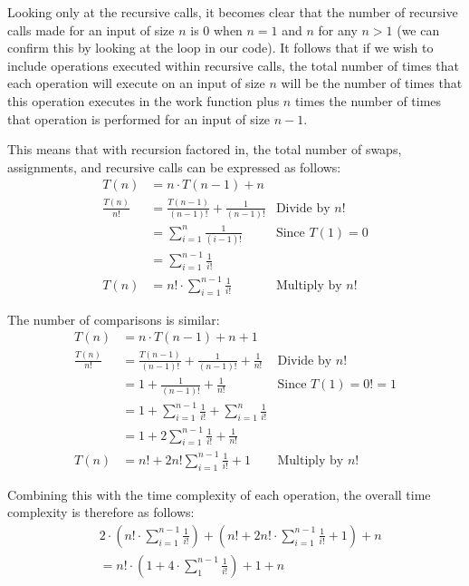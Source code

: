 \documentclass[10pt, oneside]{article}   	%
\begin{document}
Looking only at the recursive calls, it becomes clear that the number of recursive calls made for an input of size $n$ is 0 when $n = 1$ and $n$ for any $n > 1$ (we can confirm this by looking at the loop in our code). It follows that if we wish to include operations executed within recursive calls, the total number of times that each operation will execute on an input of size $n$ will be the number of times that this operation executes in the work function plus $n$ times the number of times that operation is performed for an input of size $n - 1$.

This means that with recursion factored in, the total number of swaps, assignments, and recursive calls can be expressed as follows:
\begin{align*}
	T(n) &= n \cdot T(n - 1) + n \\
	\frac{T(n)}{n!} &= \frac{T(n - 1)}{(n - 1)!} + \frac{1}{(n - 1)!} &\text{Divide by $n!$} \\
	&= \sum_{i = 1}^{n} \frac{1}{(i - 1)!} &\text{Since $T(1) = 0$} \\
	&= \sum_{i = 1}^{n - 1} \frac{1}{i!} \\
	T(n) &= n! \cdot \sum_{i = 1}^{n - 1} \frac{1}{i!} &\text{Multiply by $n!$}
\end{align*}

The number of comparisons is similar:
\begin{align*}
	T(n) &= n \cdot T(n - 1) + n + 1 \\
	\frac{T(n)}{n!} &= \frac{T(n - 1)}{(n - 1)!} + \frac{1}{(n - 1)!} + \frac{1}{n!} &\text{Divide by $n!$} \\
	&= 1 + \frac{1}{(n - 1)!} + \frac{1}{n!} &\text{Since $T(1) = 0! = 1$} \\
	&= 1 + \sum_{i = 1}^{n - 1} \frac{1}{i!} + \sum_{i = 1}^{n} \frac{1}{i!} \\
	&= 1 + 2 \sum_{i = 1}^{n - 1} \frac{1}{i!} + \frac{1}{n!} \\
	T(n) &= n! + 2n! \sum_{i = 1}^{n - 1} \frac{1}{i!} + 1 &\text{Multiply by $n!$}
\end{align*}

Combining this with the time complexity of each operation, the overall time complexity is therefore as follows:
\begin{align*}
	&2 \cdot \left( n! \cdot \sum_{i = 1}^{n - 1} \frac{1}{i!} \right) + \left( n! + 2n! \cdot \sum_{i = 1}^{n - 1} \frac{1}{i!} + 1 \right) + n \\
	&= n! \cdot \left(1 + 4 \cdot \sum_{1}^{n - 1} \frac{1}{i!} \right) + 1 + n
\end{align*}
\end{document}

